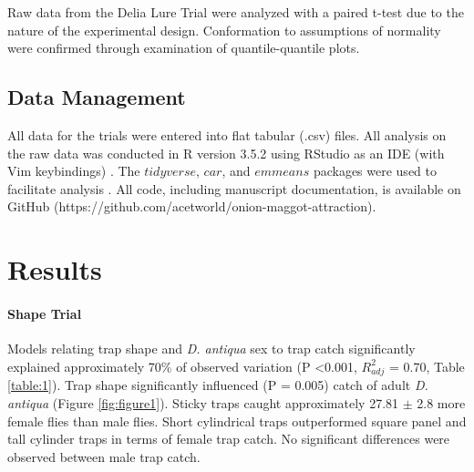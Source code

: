 \documentclass[alpha-refs]{wiley-article}
\begin{document}
Raw data from the Delia Lure Trial were analyzed with a paired t-test due to the nature of the experimental design.  Conformation to assumptions of normality were confirmed through examination of quantile-quantile plots.

\subsection{Data Management}

All data for the trials were entered into flat tabular (.csv) files.  All analysis on the raw data was conducted in R version 3.5.2 using RStudio as an IDE (with Vim keybindings) \citep{rcore2018,rstudio}.  The $tidyverse$, $car$, and $emmeans$ packages were used to facilitate analysis \citep{tidy, car, emmeans}.  All code, including manuscript documentation, is available on GitHub (https://github.com/acetworld/onion-maggot-attraction).

\section{Results}


\paragraph{Shape Trial} Models relating trap shape and \textit{D. antiqua} sex to trap catch significantly explained approximately 70\% of observed variation (P \textless 0.001, $R^2_{adj}$ = 0.70, Table \ref{table:1}).  Trap shape significantly influenced (P = 0.005) catch of adult \textit{D. antiqua} (Figure \ref{fig:figure1}).  Sticky traps caught approximately 27.81 $\pm$ 2.8 more female flies than male flies.  Short cylindrical traps outperformed square panel and tall cylinder traps in terms of female trap catch.  No significant differences were observed between male trap catch.  
\end{document}
